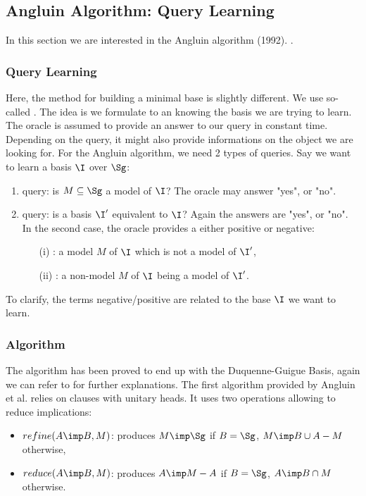 \subsection{Angluin Algorithm: Query Learning}

In this section we are interested in the Angluin algorithm (1992). 
\cite{angluin_learning_1992, arias_canonical_2009}.

\subsubsection{Query Learning}

Here, the method for building a minimal base is slightly different. We use 
so-called . The idea is we formulate 
to an  knowing the basis we are trying to learn. The oracle 
is assumed to provide an answer to our query in constant time. Depending on 
the query, it might also provide informations on the object we are looking for.
For the Angluin algorithm, we need 2 types of queries. Say we want to learn
a basis $\I$ over $\Sg$:
\begin{enumerate}
	\item {} query: is $M \subseteq \Sg$ a model of $\I$? The
	oracle may answer "yes", or "no".
	\item {} query: is a basis $\I'$ equivalent to $\I$? Again
	the answers are "yes", or "no". In the second case, the oracle provides a
	 either positive or negative:
		\begin{itemize}
			\item[(i)] : a model $M$ of $\I$ which is not a
			model of $\I'$,
			\item[(ii)] : a non-model $M$ of $\I$ being a model
			of $\I'$. 
		\end{itemize}
\end{enumerate}
\noindent To clarify, the terms negative/positive are related to the base $\I$
we want to learn.

\subsubsection{Algorithm}

The algorithm has been proved to end up with the Duquenne-Guigue Basis, again 
we can refer to \cite{angluin_learning_1992, arias_canonical_2009} for further
explanations. The first algorithm provided by Angluin et al. relies on clauses
with unitary heads. It uses two operations allowing to reduce implications:
\begin{itemize}
	\item $refine(A \imp B, M)$: produces $M \imp \Sg$ if $B = \Sg$, 
	$M \imp B \cup A - M$ otherwise,
	\item $reduce(A \imp B, M)$: produces $A \imp M - A$ if $B = \Sg$, 
	$A \imp B \cap M$ otherwise.
\end{itemize}

